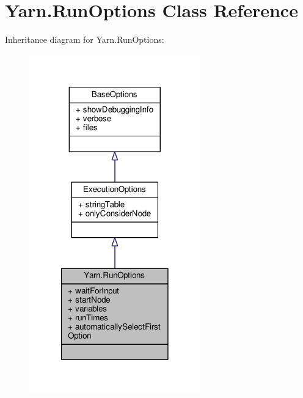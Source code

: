 \hypertarget{a00144}{\section{Yarn.\-Run\-Options Class Reference}
\label{a00144}
}


Inheritance diagram for Yarn.\-Run\-Options\-:
\nopagebreak
\begin{figure}[H]
\begin{center}
\leavevmode
\includegraphics[width=210pt]{a00654}
\end{center}
\end{figure}


